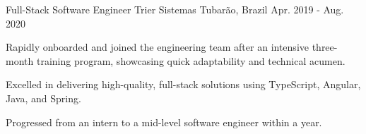 \begin{cventries}
  \cventry
    {Full-Stack Software Engineer} %
    {Trier Sistemas} %
    {Tubarão, Brazil} %
    {Apr. 2019 - Aug. 2020} %
    {
      \begin{cvitems} %
        \item {Rapidly onboarded and joined the engineering team after an intensive three-month training program, showcasing quick adaptability and technical acumen.}
        \item {Excelled in delivering high-quality, full-stack solutions using TypeScript, Angular, Java, and Spring. }
        \item {Progressed from an intern to a mid-level software engineer within a year.}
      \end{cvitems}
    }

\end{cventries}
